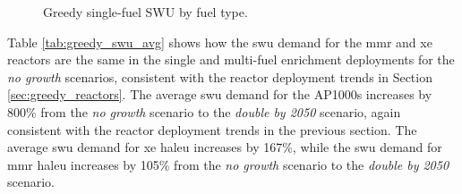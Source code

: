 
\begin{figure}[H]
  \hfill
  \caption{Greedy single-fuel SWU by fuel type.}
  \label{fig:greedy_of_swu}
\end{figure}

Table \ref{tab:greedy_swu_avg} shows how the \gls{swu} demand for the \gls{mmr} and \gls{xe} reactors are the same in the single and multi-fuel enrichment deployments for the \textit{no growth} scenarios, consistent with the reactor deployment trends in Section \ref{sec:greedy_reactors}. The average \gls{swu} demand for the AP1000s increases by 800\% from the \textit{no growth} scenario to the \textit{double by 2050} scenario, again consistent with the reactor deployment trends in the previous section. The average \gls{swu} demand for \gls{xe} \gls{haleu} increases by 167\%, while the \gls{swu} demand for \gls{mmr} \gls{haleu} increases by 105\% from the \textit{no growth} scenario to the \textit{double by 2050} scenario.

